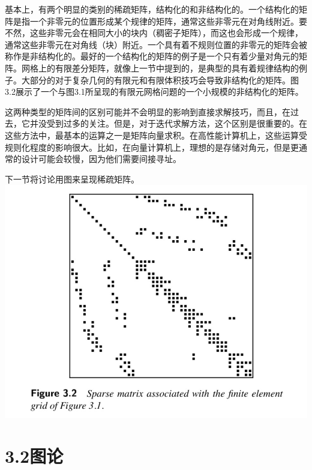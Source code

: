 \documentclass{article}
\begin{document}
基本上，有两个明显的类别的稀疏矩阵，结构化的和非结构化的。一个结构化的矩阵是指一个非零元的位置形成某个规律的矩阵，通常这些非零元在对角线附近。要不然，这些非零元会在相同大小的块内（稠密子矩阵），而这也会形成一个规律，通常这些非零元在对角线（块）附近。一个具有着不规则位置的非零元的矩阵会被称作是非结构化的。最好的一个结构化的矩阵的例子是一个只有着少量对角元的矩阵。网格上的有限差分矩阵，就像上一节中提到的，是典型的具有着规律结构的例子。大部分的对于复杂几何的有限元和有限体积技巧会导致非结构化的矩阵。图3.2展示了一个与图3.1所呈现的有限元网格问题的一个小规模的非结构化的矩阵。
\newline

这两种类型的矩阵间的区别可能并不会明显的影响到直接求解技巧，而且，在过去，它并没受到过多的关注。但是，对于迭代求解方法，这个区别是很重要的。在这些方法中，最基本的运算之一是矩阵向量求积。在高性能计算机上，这些运算受规则化程度的影响很大。比如，在向量计算机上，理想的是存储对角元，但是更通常的设计可能会较慢，因为他们需要间接寻址。
\newline

下一节将讨论用图来呈现稀疏矩阵。
\newline\newline\newline\newline\newline\newline
\includegraphics[scale=0.4]{3_2.png}
\newline\newline
\section*{3.2图论}
\end{document}
